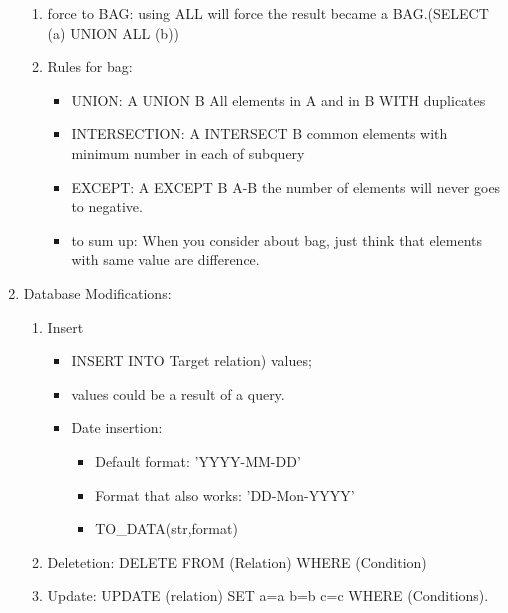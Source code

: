 \begin{enumerate}
\begin{enumerate}
    \item force to BAG: using ALL will force the result became a BAG.(SELECT (a) UNION ALL (b))
    \item Rules for bag:
    \begin{itemize}
        \item UNION: A UNION B All elements in A and in B WITH duplicates
        \item INTERSECTION: A INTERSECT B common elements with minimum number in each of subquery
        \item EXCEPT: A EXCEPT B A-B the number of elements will never goes to negative.
        \item to sum up: When you consider about bag, just think that elements with same value are difference.
    \end{itemize}
    \end{enumerate}
    \item Database Modifications:
    \begin{enumerate}
        \item Insert \begin{itemize}
            \item INSERT INTO Target relation) values;
            \item values could be a result of a query.
            \item Date insertion: \begin{itemize}
                \item Default format: 'YYYY-MM-DD'
                \item Format that also works: 'DD-Mon-YYYY'
                \item TO\_DATA(str,format)
            \end{itemize}
        \end{itemize}
        \item Deletetion:
            DELETE FROM (Relation) WHERE (Condition)
        \item Update: UPDATE (relation) SET a=a b=b c=c WHERE (Conditions).
    \end{enumerate}
    
\end{enumerate}

